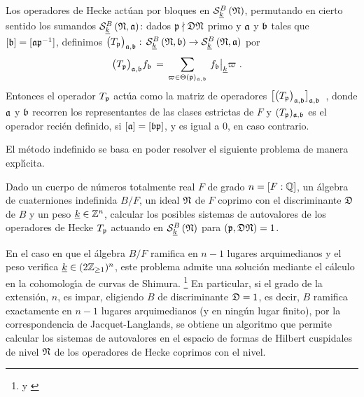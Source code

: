 \begin{obsHeckeParaIndefinidosPorBloques}%
	\label{obs:heckeparaindefinidosporbloques}
	Los operadores de Hecke act\'{u}an por bloques en
	$\spitzH[B]{k}{\frak{N}}$, permutando en cierto sentido los sumandos
	$\spitzH[B]{k}{\frak{N},\frak{a}}$: dados
	$\frak{p}\nmid\frak{D}\frak{N}$ primo y $\frak{a}$ y $\frak{b}$ tales
	que $[\frak{b}]=[\frak{a}\frak{p}^{-1}]$, definimos
	\begin{math}
		\big(T_{\frak{p}}\big)_{\frak{a},\frak{b}}:\,
			\spitzH[B]{k}{\frak{N},\frak{b}}\rightarrow
			\spitzH[B]{k}{\frak{N},\frak{a}}
	\end{math}
	por
	\begin{align*}
		\big(T_{\frak{p}}\big)_{\frak{a},\frak{b}}f_{\frak{b}} & \,=\,
		\sum_{\varpi\in\Theta(\frak{p})_{\frak{a},\frak{b}}}\,
			f_{\frak{b}}\operadormatrices{\peso{k}}{\varpi}
		\text{ .}
	\end{align*}
	Entonces el operador $T_{\frak{p}}$ act\'{u}a como la matriz de
	operadores
	\begin{math}
		\big[\big(T_{\frak{p}}\big)_{\frak{a},\frak{b}}
			\big]_{\frak{a},\frak{b}}
	\end{math}~,
	donde $\frak{a}$ y $\frak{b}$ recorren los representantes de las
	clases estrictas de $F$ y $(T_{\frak{p}})_{\frak{a},\frak{b}}$ es
	el operador reci\'{e}n definido, si $[\frak{a}]=[\frak{b}\frak{p}]$, y
	es igual a $0$, en caso contrario.
\end{obsHeckeParaIndefinidosPorBloques}

El m\'{e}todo indefinido se basa en poder resolver el siguiente problema de
manera expl\'{\i}cita.

\begin{probFormasIndefinida}\label{prob:formasindefinida}
	Dado un cuerpo de n\'{u}meros totalmente real $F$ de grado
	$n=[F:\bb{Q}]$, un \'{a}lgebra de cuaterniones indefinida $B/F$, un
	ideal $\frak{N}$ de $F$ coprimo con el discriminante $\frak{D}$ de $B$
	y un peso $\peso{k}\in\bb{Z}^{n}$, calcular los posibles
	sistemas de autovalores de los operadores de Hecke $T_{\frak{p}}$
	actuando en $\spitzH[B]{k}{\frak{N}}$ para
	$(\frak{p},\frak{D}\frak{N})=1$.
\end{probFormasIndefinida}

En el caso en que el \'{a}lgebra $B/F$ ramifica en $n-1$ lugares arquimedianos
y el peso verifica $\peso{k}\in (2\bb{Z}_{\geq 1})^{n}$, este problema admite
una soluci\'{o}n mediante el c\'{a}lculo en la cohomolog\'{\i}a de curvas de
Shimura.%
\footnote{
	\cite{GreenbergVoight} y \cite{VoightComputingOverArbitrary}
}
En particular, si el grado de la extensi\'{o}n, $n$, es impar, eligiendo $B$ de
discriminante $\frak{D}=1$, es decir, $B$ ramifica exactamente en $n-1$ lugares
arquimedianos (y en ning\'{u}n lugar finito), por la correspondencia de
Jacquet-Langlands, se obtiene un algoritmo que permite calcular los sistemas de
autovalores en el espacio de formas de Hilbert cuspidales de nivel $\frak{N}$
de los operadores de Hecke coprimos con el nivel.

